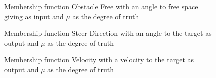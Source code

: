 \documentclass[../Head/Main.tex]{subfiles}
\begin{document}
\begin{figure}[H]
	\centering
	
	\caption{Membership function Obstacle Free with an angle to free space giving as input and  $\mu$ as the degree of truth}
	\label{fig:MSF_Obstacle_free}
\end{figure}

\begin{figure}[H]
	\centering
	
	\caption{Membership function Steer Direction with an angle to the target as output and $\mu$ as the degree of truth}
	\label{fig:MSF_Steer_direction}
\end{figure}

\begin{figure}[H]
	\centering
	
	\caption{Membership function Velocity with a velocity to the target as output and $\mu$ as the degree of truth}				\label{fig:MSF_Velocity}
\end{figure}
\end{document}
